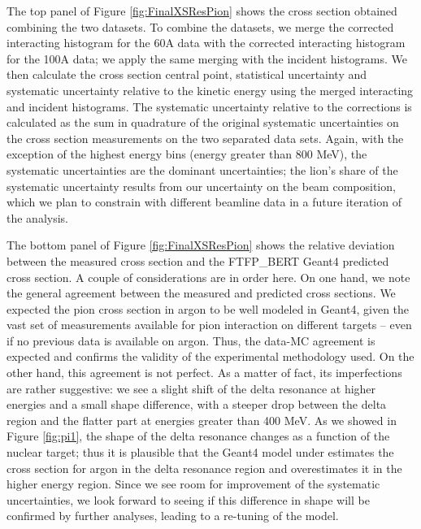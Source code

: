 The top panel of Figure \ref{fig:FinalXSResPion} shows the cross section obtained combining the two datasets. To combine the datasets, we merge the corrected interacting histogram for the 60A data with the corrected interacting histogram for the 100A data; we apply the same merging with the incident histograms. We then calculate the cross section central point, statistical uncertainty and systematic uncertainty relative to the kinetic energy using the merged interacting and incident histograms. The systematic uncertainty relative to the corrections is calculated as the sum in quadrature of the original systematic uncertainties on the cross section measurements on the two separated data sets. Again, with the exception of the highest energy bins (energy greater than 800 MeV), the systematic uncertainties are the dominant uncertainties; the lion's share of the systematic uncertainty results from our uncertainty on the beam composition, which we plan to constrain with different beamline data in a future iteration of the analysis.

The bottom panel of Figure  \ref{fig:FinalXSResPion} shows the relative deviation between the measured cross section and the FTFP\_BERT  Geant4 predicted cross section.
A couple of considerations are in order here. On one hand, we note the general agreement between the measured and predicted cross sections. We expected the pion cross section in argon to be well modeled in Geant4, given the vast set of measurements available for pion interaction on different targets -- even if no previous data is available on argon. Thus, the data-MC agreement is expected and confirms the validity of the experimental methodology used.
On the other hand, this agreement is not perfect.  As a matter of fact, its imperfections are rather suggestive: we see a slight shift of the delta resonance at higher energies and a small shape difference, with a steeper drop between the delta region and the flatter part at energies greater than 400 MeV. As we showed in Figure \ref{fig:pi1}, the shape of the delta resonance changes as a function of the nuclear target; thus it is plausible that the Geant4 model under estimates the cross section for argon in the delta resonance region and overestimates it in the higher energy region. Since we see room for improvement of the systematic uncertainties, we look forward to seeing if this difference in shape will be confirmed by further analyses, leading to a re-tuning of the model.

